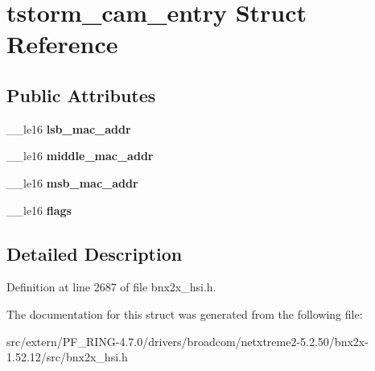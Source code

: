 \hypertarget{structtstorm__cam__entry}{
\section{tstorm\_\-cam\_\-entry Struct Reference}
\label{structtstorm__cam__entry}
}
\subsection*{Public Attributes}
\begin{DoxyCompactItemize}
\item 
\hypertarget{structtstorm__cam__entry_a7a95eb3aadfa912c57b87afddc72dce0}{
\_\-\_\-le16 {\bfseries lsb\_\-mac\_\-addr}}
\label{structtstorm__cam__entry_a7a95eb3aadfa912c57b87afddc72dce0}

\item 
\hypertarget{structtstorm__cam__entry_ac2e5e9dd41e36d6eb2efa584bb843949}{
\_\-\_\-le16 {\bfseries middle\_\-mac\_\-addr}}
\label{structtstorm__cam__entry_ac2e5e9dd41e36d6eb2efa584bb843949}

\item 
\hypertarget{structtstorm__cam__entry_a57eb42d9f29f5bb76a1c65f9db2da172}{
\_\-\_\-le16 {\bfseries msb\_\-mac\_\-addr}}
\label{structtstorm__cam__entry_a57eb42d9f29f5bb76a1c65f9db2da172}

\item 
\hypertarget{structtstorm__cam__entry_a507efec3f4a2927c5f2a2ec7745c4fcf}{
\_\-\_\-le16 {\bfseries flags}}
\label{structtstorm__cam__entry_a507efec3f4a2927c5f2a2ec7745c4fcf}

\end{DoxyCompactItemize}


\subsection{Detailed Description}


Definition at line 2687 of file bnx2x\_\-hsi.h.



The documentation for this struct was generated from the following file:\begin{DoxyCompactItemize}
\item 
src/extern/PF\_\-RING-\/4.7.0/drivers/broadcom/netxtreme2-\/5.2.50/bnx2x-\/1.52.12/src/bnx2x\_\-hsi.h\end{DoxyCompactItemize}
